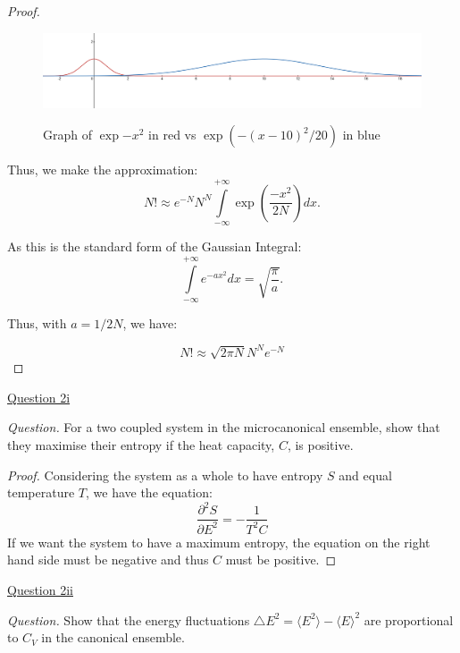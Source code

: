 \documentclass[11pt]{article}
\begin{document}
\begin{proof}
\begin{figure}[H]
\centering \includegraphics[scale=0.4]{Question 1.1.png} \label{fig:FFTgen}
\caption{Graph of $\exp{-x^2}$ in red vs $\exp(-{(x-10)^2}/{20})$ in blue}
\end{figure}
\newpage
Thus, we make the approximation:
\begin{equation}
    N! \approx e^{-N} N^N \int\limits_{-\infty}^{+\infty} \exp\left(\frac{-x^2}{2N}\right) dx.
\end{equation}

As this is the standard form of the Gaussian Integral:
\begin{equation}
    \int\limits_{-\infty}^{+\infty}e^{-ax^2} dx = \sqrt{\frac{\pi}{a}}.
\end{equation}

Thus, with $a= 1/2N$, we have:

\begin{equation}
    N! \approx \sqrt{2\pi N} N^N e^{-N}
\end{equation}
    
\end{proof}


\underline{Question 2i}

\textit{Question.} For a two coupled system in the microcanonical ensemble, show that they maximise their entropy if the heat capacity, $C$, is positive.

\begin{proof}
Considering the system as a whole to have entropy $S$ and equal temperature $T$, we have the equation:
\begin{equation}
    \frac{\partial^2S}{\partial E^2} = -\frac{1}{T^2C}
\end{equation}
If we want the system to have a maximum entropy, the equation on the right hand side must be negative and thus $C$ must be positive.

\end{proof}

\underline{Question 2ii}

\textit{Question.} Show that the energy fluctuations $\triangle E^2 = \langle E^2 \rangle - \langle E\rangle ^2$ are proportional to $C_V$ in the canonical ensemble.
\end{document}
